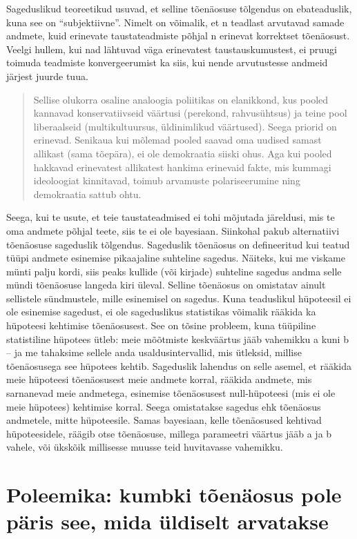 \documentclass[]{book}
\begin{document}
Sageduslikud teoreetikud usuvad, et selline tõenäosuse tõlgendus on
ebateaduslik, kuna see on ``subjektiivne''. Nimelt on võimalik, et n
teadlast arvutavad samade andmete, kuid erinevate taustateadmiste põhjal
n erinevat korrektset tõenäosust. Veelgi hullem, kui nad lähtuvad väga
erinevatest taustauskumustest, ei pruugi toimuda teadmiste
konvergeerumist ka siis, kui nende arvutustesse andmeid järjest juurde
tuua.

\begin{quote}
Sellise olukorra osaline analoogia poliitikas on elanikkond, kus pooled
kannavad konservatiivseid väärtusi (perekond, rahvusühtsus) ja teine
pool liberaalseid (multikultuursus, üldinimlikud väärtused). Seega
priorid on erinevad. Senikaua kui mõlemad pooled saavad oma uudised
samast allikast (sama tõepära), ei ole demokraatia siiski ohus. Aga kui
pooled hakkavad erinevatest allikatest hankima erinevaid fakte, mis
kummagi ideoloogiat kinnitavad, toimub arvamuste polariseerumine ning
demokraatia sattub ohtu.
\end{quote}

Seega, kui te usute, et teie taustateadmised ei tohi mõjutada järeldusi,
mis te oma andmete põhjal teete, siis te ei ole bayesiaan. Siinkohal
pakub alternatiivi tõenäosuse sageduslik tõlgendus. Sageduslik tõenäosus
on defineeritud kui teatud tüüpi andmete esinemise pikaajaline suhteline
sagedus. Näiteks, kui me viskame münti palju kordi, siis peaks kullide
(või kirjade) suhteline sagedus andma selle mündi tõenäosuse langeda
kiri üleval. Selline tõenäosus on omistatav ainult sellistele
sündmustele, mille esinemisel on sagedus. Kuna teaduslikul hüpoteesil ei
ole esinemise sagedust, ei ole sageduslikus statistikas võimalik rääkida
ka hüpoteesi kehtimise tõenäosusest. See on tõsine probleem, kuna
tüüpiline statistiline hüpotees ütleb: meie mõõtmiste keskväärtus jääb
vahemikku a kuni b -- ja me tahaksime sellele anda usaldusintervallid,
mis ütleksid, millise tõenäosusega see hüpotees kehtib. Sageduslik
lahendus on selle asemel, et rääkida meie hüpoteesi tõenäosusest meie
andmete korral, rääkida andmete, mis sarnanevad meie andmetega,
esinemise tõenäosusest null-hüpoteesi (mis ei ole meie hüpotees)
kehtimise korral. Seega omistatakse sagedus ehk tõenäosus andmetele,
mitte hüpoteesile. Samas bayesiaan, kelle tõenäosused kehtivad
hüpoteesidele, räägib otse tõenäosuse, millega parameetri väärtus jääb a
ja b vahele, või ükskõik millisesse muusse teid huvitavasse vahemikku.

\section*{Poleemika: kumbki tõenäosus pole päris see, mida üldiselt
arvatakse}\label{poleemika-kumbki-toenaosus-pole-paris-see-mida-uldiselt-arvatakse-1}
\end{document}
